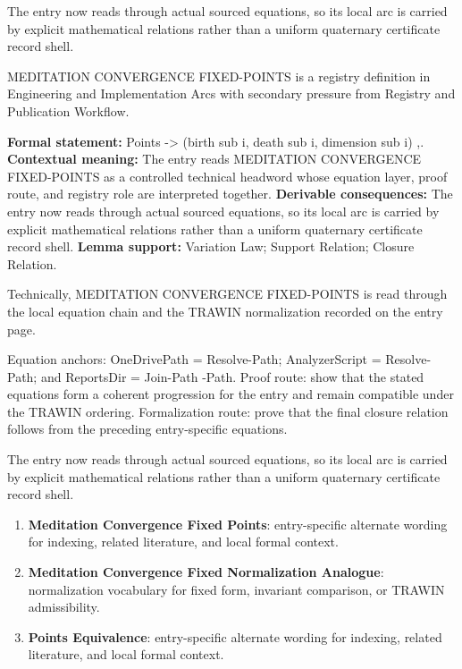 The entry now reads through actual sourced equations, so its local arc is carried by explicit mathematical relations rather than a uniform quaternary certificate record shell.
\clearpage


\begingroup\small
{}
MEDITATION CONVERGENCE FIXED-POINTS is a registry definition in Engineering and Implementation Arcs with secondary pressure from Registry and Publication Workflow.

\begingroup\footnotesize\setlength{\emergencystretch}{3em}\sloppy
\textbf{Formal statement:} Points -> (birth sub i, death sub i, dimension sub i) ,. \textbf{Contextual meaning:} The entry reads MEDITATION CONVERGENCE FIXED-POINTS as a controlled technical headword whose equation layer, proof route, and registry role are interpreted together. \textbf{Derivable consequences:} The entry now reads through actual sourced equations, so its local arc is carried by explicit mathematical relations rather than a uniform quaternary certificate record shell. \textbf{Lemma support:} Variation Law; Support Relation; Closure Relation.\par
\endgroup

Technically, MEDITATION CONVERGENCE FIXED-POINTS is read through the local equation chain and the TRAWIN normalization recorded on the entry page.

Equation anchors: OneDrivePath = Resolve-Path; AnalyzerScript = Resolve-Path; and ReportsDir = Join-Path -Path. Proof route: show that the stated equations form a coherent progression for the entry and remain compatible under the TRAWIN ordering. Formalization route: prove that the final closure relation follows from the preceding entry-specific equations.

The entry now reads through actual sourced equations, so its local arc is carried by explicit mathematical relations rather than a uniform quaternary certificate record shell.
\endgroup

\begin{enumerate}[leftmargin=1.6em,itemsep=6pt,topsep=4pt]
\item \textbf{Meditation Convergence Fixed Points}: entry-specific alternate wording for indexing, related literature, and local formal context.
\item \textbf{Meditation Convergence Fixed Normalization Analogue}: normalization vocabulary for fixed form, invariant comparison, or TRAWIN admissibility.
\item \textbf{Points Equivalence}: entry-specific alternate wording for indexing, related literature, and local formal context.
\end{enumerate}

